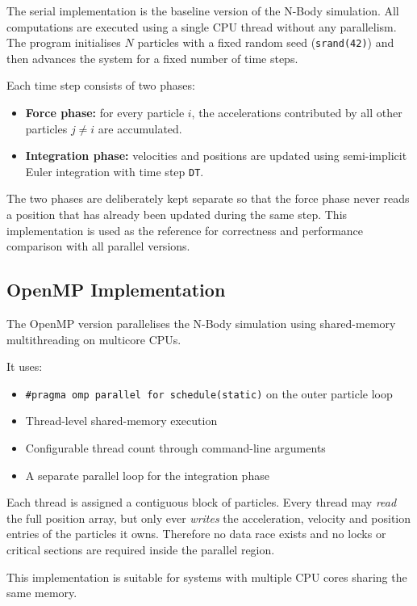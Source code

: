 \documentclass[11pt,a4paper]{article}
\begin{document}
The serial implementation is the baseline version of the N-Body simulation.
All computations are executed using a single CPU thread without any
parallelism. The program initialises $N$ particles with a fixed random seed
(\texttt{srand(42)}) and then advances the system for a fixed number of time
steps.

Each time step consists of two phases:
\begin{itemize}
  \item \textbf{Force phase:} for every particle $i$, the accelerations
        contributed by all other particles $j \neq i$ are accumulated.
  \item \textbf{Integration phase:} velocities and positions are updated using
        semi-implicit Euler integration with time step \texttt{DT}.
\end{itemize}

The two phases are deliberately kept separate so that the force phase never
reads a position that has already been updated during the same step. This
implementation is used as the reference for correctness and performance
comparison with all parallel versions.

\subsection{OpenMP Implementation}

The OpenMP version parallelises the N-Body simulation using shared-memory
multithreading on multicore CPUs.

It uses:
\begin{itemize}
  \item \texttt{\#pragma omp parallel for schedule(static)} on the outer
        particle loop
  \item Thread-level shared-memory execution
  \item Configurable thread count through command-line arguments
  \item A separate parallel loop for the integration phase
\end{itemize}

Each thread is assigned a contiguous block of particles. Every thread may
\emph{read} the full position array, but only ever \emph{writes} the
acceleration, velocity and position entries of the particles it owns.
Therefore no data race exists and no locks or critical sections are required
inside the parallel region.

This implementation is suitable for systems with multiple CPU cores sharing
the same memory.
\end{document}
